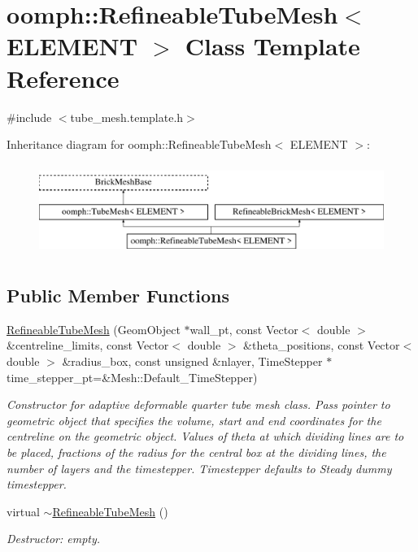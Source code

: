 \hypertarget{classoomph_1_1RefineableTubeMesh}{}\section{oomph\+:\+:Refineable\+Tube\+Mesh$<$ E\+L\+E\+M\+E\+NT $>$ Class Template Reference}
\label{classoomph_1_1RefineableTubeMesh}


{\ttfamily \#include $<$tube\+\_\+mesh.\+template.\+h$>$}

Inheritance diagram for oomph\+:\+:Refineable\+Tube\+Mesh$<$ E\+L\+E\+M\+E\+NT $>$\+:\begin{figure}[H]
\begin{center}
\leavevmode
\includegraphics[height=3.000000cm]{classoomph_1_1RefineableTubeMesh}
\end{center}
\end{figure}
\subsection*{Public Member Functions}
\begin{DoxyCompactItemize}
\item 
\hyperlink{classoomph_1_1RefineableTubeMesh_a0b8e2307c2d4594196f78a6278d9bbf7}{Refineable\+Tube\+Mesh} (Geom\+Object $\ast$wall\+\_\+pt, const Vector$<$ double $>$ \&centreline\+\_\+limits, const Vector$<$ double $>$ \&theta\+\_\+positions, const Vector$<$ double $>$ \&radius\+\_\+box, const unsigned \&nlayer, Time\+Stepper $\ast$time\+\_\+stepper\+\_\+pt=\&Mesh\+::\+Default\+\_\+\+Time\+Stepper)
\begin{DoxyCompactList}\small\item\em Constructor for adaptive deformable quarter tube mesh class. Pass pointer to geometric object that specifies the volume, start and end coordinates for the centreline on the geometric object. Values of theta at which dividing lines are to be placed, fractions of the radius for the central box at the dividing lines, the number of layers and the timestepper. Timestepper defaults to Steady dummy timestepper. \end{DoxyCompactList}\item 
virtual \hyperlink{classoomph_1_1RefineableTubeMesh_a743f3d17c3d5f0abe88ee1a7bda0b149}{$\sim$\+Refineable\+Tube\+Mesh} ()
\begin{DoxyCompactList}\small\item\em Destructor\+: empty. \end{DoxyCompactList}\end{DoxyCompactItemize}
